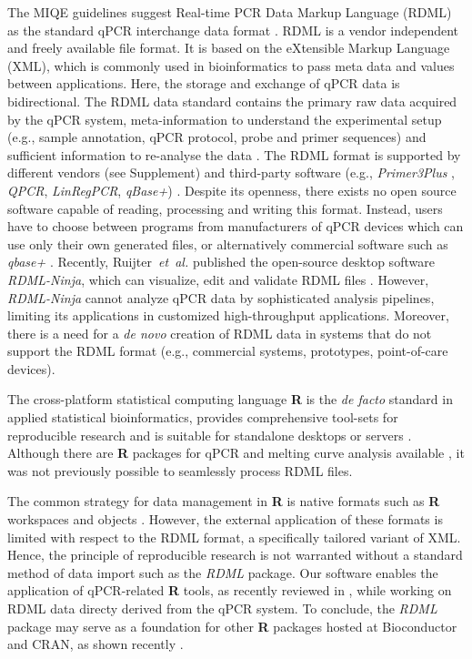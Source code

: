 \documentclass{bioinfo}
\begin{document}
The MIQE guidelines suggest Real-time PCR Data Markup Language (RDML) as the standard 
qPCR interchange data format \cite{rdml-ninja_2015}. RDML is a vendor 
independent and freely available file format.  It is based on the 
eXtensible Markup Language (XML), which is commonly used in bioinformatics 
\cite{achard_xml_2001} to pass meta data and values between applications. 
Here, the storage and exchange of qPCR data is bidirectional. The RDML data standard 
contains the primary raw data acquired by the qPCR system, meta-information to 
understand the experimental setup (e.g., sample annotation, qPCR protocol, probe 
and primer sequences) and sufficient information to re-analyse the data 
\cite{lefever_rdml_2009}. The RDML format is supported by different vendors (see 
Supplement) and third-party software (e.g., \textit{Primer3Plus} 
\cite{untergasser_2007}, \textit{QPCR}, \textit{LinRegPCR}, \textit{qBase+}) 
\cite{pabinger_2014, rdml-ninja_2015}. Despite  its openness, 
there exists no open source software capable of reading, processing and writing 
this format. Instead, users have to choose between programs from manufacturers of qPCR 
devices which can use only their own generated files, or alternatively commercial software 
such as \textit{qbase+} \cite{pabinger_2014, rdml-ninja_2015}. Recently, 
Ruijter~\textit{et~al.} published the open-source desktop software 
\textit{RDML-Ninja}, which can visualize, edit and validate RDML files 
\cite{rdml-ninja_2015}. However, \textit{RDML-Ninja} cannot analyze qPCR 
data by sophisticated analysis pipelines, limiting its applications in 
customized high-throughput applications. Moreover, there is a need for a \textit{de novo} 
creation of RDML data in systems that do not 
support the RDML format (e.g., commercial systems, prototypes, point-of-care devices). 

The cross-platform statistical computing language \textbf{R} is  the \textit{de facto} standard in applied 
statistical bioinformatics, provides comprehensive tool-sets for reproducible research \cite{leeper_archiving_2014, 
liu_r_2014, roediger2015r} and is suitable for standalone desktops or servers \cite{roediger2015r}. 
Although there are \textbf{R} packages for qPCR and melting 
curve analysis available \cite{pabinger_2014, ritz_qpcr_2008, 
roediger_RJ_2013, roediger2015chippcr}, it was not previously possible 
to seamlessly process RDML files.

The common strategy for data management in \textbf{R}  is native formats such 
as  \textbf{R} workspaces  and objects \cite{roediger_rkward_2012}. However, 
the external application of these  formats is limited with respect to the RDML format, 
a specifically tailored variant of XML. Hence, the principle of reproducible research 
is not warranted without a standard method of data import such as the \textit{RDML} 
package. Our software enables  the application of  qPCR-related \textbf{R} tools, as 
recently reviewed in \cite{pabinger_2014}, while working on  RDML data directy 
derived  from the qPCR system. To conclude, the \textit{RDML} package may 
serve as a foundation for other \textbf{R} packages hosted at Bioconductor 
\cite{gentleman_2004} and CRAN, as shown recently \cite{roediger2015r}.
\end{document}
